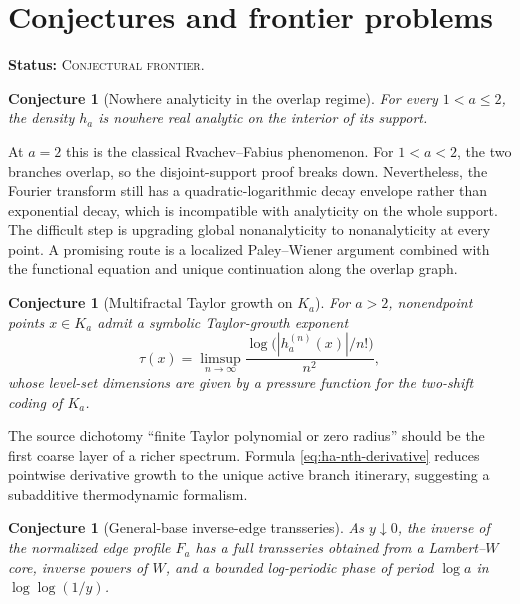 \documentclass[11pt,oneside]{article}
\newtheorem{conjecture}[theorem]{Conjecture}
\theoremstyle{definition}
\theoremstyle{remark}
\newcommand{\FrontierStatus}{\textcolor{FrontierRed}{\textsc{Conjectural frontier}}}
\newcommand{\status}[1]{\par\smallskip\noindent\textbf{Status:} #1.\par\smallskip}
\begin{document}
\section{Conjectures and frontier problems}
\label{sec:conjectures}
\status{\FrontierStatus}

\begin{conjecture}[Nowhere analyticity in the overlap regime]
\label{conj:overlap-analyticity}
For every \(1<a\le2\), the density \(h_a\) is nowhere real analytic on the interior of its support.
\end{conjecture}

At \(a=2\) this is the classical Rvachev--Fabius phenomenon.  For \(1<a<2\), the two branches overlap, so the disjoint-support proof breaks down.  Nevertheless, the Fourier transform still has a quadratic-logarithmic decay envelope rather than exponential decay, which is incompatible with analyticity on the whole support.  The difficult step is upgrading global nonanalyticity to nonanalyticity at every point.  A promising route is a localized Paley--Wiener argument combined with the functional equation and unique continuation along the overlap graph.

\begin{conjecture}[Multifractal Taylor growth on \(K_a\)]
\label{conj:taylor-multifractal}
For \(a>2\), nonendpoint points \(x\in K_a\) admit a symbolic Taylor-growth exponent
\begin{equation}
  \tau(x)=\limsup_{n\to\infty}
  \frac{\log\bigl(|h_a^{(n)}(x)|/n!\bigr)}{n^2},
  \label{eq:tau-x}
\end{equation}
whose level-set dimensions are given by a pressure function for the two-shift coding of \(K_a\).
\end{conjecture}

The source dichotomy ``finite Taylor polynomial or zero radius'' should be the first coarse layer of a richer spectrum.  Formula \eqref{eq:ha-nth-derivative} reduces pointwise derivative growth to the unique active branch itinerary, suggesting a subadditive thermodynamic formalism.

\begin{conjecture}[General-base inverse-edge transseries]
\label{conj:general-base-lambert}
As \(y\downarrow0\), the inverse of the normalized edge profile \(F_a\) has a full transseries obtained from a Lambert--\(W\) core, inverse powers of \(W\), and a bounded log-periodic phase of period \(\log a\) in \(\log\log(1/y)\).
\end{conjecture}
\end{document}
